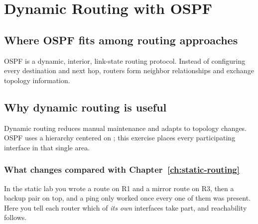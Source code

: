 \chapter{Dynamic Routing with OSPF}\label{ch:ospf}

\section{Where OSPF fits among routing approaches}
OSPF is a dynamic, interior, link-state routing protocol. Instead of configuring every destination and next hop, routers form neighbor relationships and exchange topology information.


\section{Why dynamic routing is useful}
Dynamic routing reduces manual maintenance and adapts to topology changes. OSPF uses a hierarchy centered on ; this exercise places every participating interface in that single area.

\subsection{What changes compared with Chapter~\ref{ch:static-routing}}
In the static lab you wrote a route on R1 and a mirror route on R3, then a backup pair on top, and a ping only worked once every one of them was present. Here you tell each router which of \emph{its own} interfaces take part, and reachability follows.

